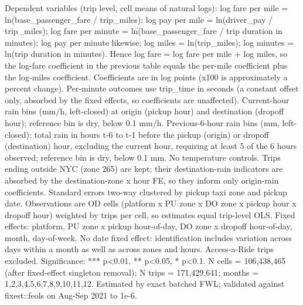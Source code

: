 \par \raggedright 
Dependent variables (trip level, cell means of natural logs): log fare per mile = ln(base\_passenger\_fare / trip\_miles); log pay per mile = ln(driver\_pay / trip\_miles); log fare per minute = ln(base\_passenger\_fare / trip duration in minutes); log pay per minute likewise; log miles = ln(trip\_miles); log minutes = ln(trip duration in minutes). Hence log fare = log fare per mile + log miles, so the log-fare coefficient in the previous table equals the per-mile coefficient plus the log-miles coefficient. Coefficients are in log points (x100 is approximately a percent change). Per-minute outcomes use trip\_time in seconds (a constant offset only, absorbed by the fixed effects, so coefficients are unaffected). Current-hour rain bins (mm/h, left-closed) at origin (pickup hour) and destination (dropoff hour); reference bin is dry, below 0.1 mm/h. Previous-6-hour rain bins (mm, left-closed): total rain in hours t-6 to t-1 before the pickup (origin) or dropoff (destination) hour, excluding the current hour, requiring at least 5 of the 6 hours observed; reference bin is dry, below 0.1 mm. No temperature controls. Trips ending outside NYC (zone 265) are kept; their destination-rain indicators are absorbed by the destination-zone x hour FE, so they inform only origin-rain coefficients. Standard errors two-way clustered by pickup taxi zone and pickup date. Observations are OD cells (platform x PU zone x DO zone x pickup hour x dropoff hour) weighted by trips per cell, so estimates equal trip-level OLS. Fixed effects: platform, PU zone x pickup hour-of-day, DO zone x dropoff hour-of-day, month, day-of-week. No date fixed effect: identification includes variation across days within a month as well as across zones and hours. Access-a-Ride trips excluded. Significance: *** p<0.01, ** p<0.05, * p<0.1. N cells = 106,438,465 (after fixed-effect singleton removal); N trips = 171,429,641; months = 1,2,3,4,5,6,7,8,9,10,11,12. Estimated by exact batched FWL; validated against fixest::feols on Aug-Sep 2021 to 1e-6.
\par\endgroup
\ifdefined\ifclassloaded
{}
\fi
